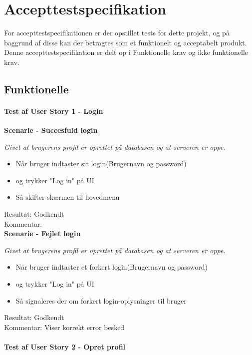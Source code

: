 \section{Accepttestspecifikation}
For accepttestspecifikationen er der opstillet tests for dette projekt, og på baggrund af disse kan der betragtes som et funktionelt og acceptabelt produkt. Denne accepttestspecifikation er delt op i Funktionelle krav og ikke funktionelle krav.

\subsection{Funktionelle}
\paragraph{Test af User Story 1 - Login}

\bf{Scenarie - Succesfuld login}

\it{Givet at brugerens profil er oprettet på databasen og at serveren er oppe.}

\begin{itemize}
  \item Når bruger indtaster sit login(Brugernavn og password)
  \item og trykker "Log in" på UI
  \item Så skifter skærmen til hovedmenu
\end{itemize}

Resultat: Godkendt\\
Kommentar:\\

\bf{Scenarie - Fejlet login}

\it{Givet at brugerens profil er oprettet på databasen og at serveren er oppe.}

\begin{itemize}
  \item Når bruger indtaster et forkert login(Brugernavn og password)
  \item og trykker "Log in" på UI
  \item Så signaleres der om forkert login-oplysninger til bruger
\end{itemize}

Resultat: Godkendt\\
Kommentar: Viser korrekt error besked\\

\paragraph{Test af User Story 2 - Opret profil}

